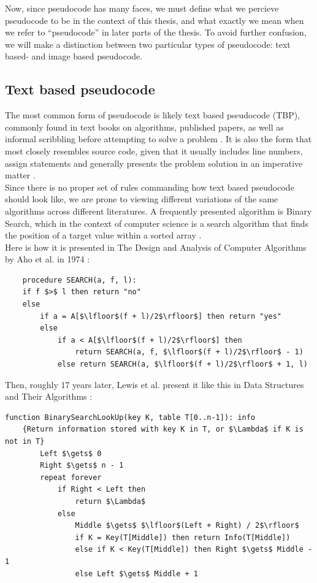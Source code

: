 Now, since pseudocode has many faces, we must define what we percieve pseudocode to be in the context of this thesis, and what exactly we mean when we refer to ``pseudocode'' in later parts of the thesis. To avoid further confusion, we will make a distinction between two particular types of pseudocode: text based- and image based pseudocode.

\subsection{Text based pseudocode}

The most common form of pseudocode is likely text based pseudocode (TBP), commonly found in text books on algorithms, published papers, as well as informal scribbling before attempting to solve a problem \cite{payAttentionToMLPs}\cite{BOOK:intro/Cormen/Leiserson}. It is also the form that most closely resembles source code, given that it usually includes line numbers, assign statements and generally presents the problem solution in an imperative matter \cite{proposalForParadigmGeneralPseudocode}. \hfill \\

Since there is no proper set of rules commanding how text based pseudocode should look like, we are prone to viewing different variations of the same algorithms across different literatures. A frequently presented algorithm is Binary Search, which in the context of computer science is a search algorithm that finds the position of a target value within a sorted array \cite{BOOK:intro/Cormen/Leiserson}. \hfill \\

Here is how it is presented in The Design and Analysis of Computer Algorithms by Aho et al. in 1974 \cite[139]{BOOK:DesignAnalysis/Aho}:

\begin{lstlisting}
    procedure SEARCH(a, f, l):
    if f $>$ l then return "no"
    else
        if a = A[$\lfloor$(f + l)/2$\rfloor$] then return "yes"
        else
            if a < A[$\lfloor$(f + l)/2$\rfloor$] then
                return SEARCH(a, f, $\lfloor$(f + l)/2$\rfloor$ - 1)
            else return SEARCH(a, $\lfloor$(f + l)/2$\rfloor$ + 1, l)
\end{lstlisting}

Then, roughly 17 years later, Lewis et al. present it like this in Data Structures and Their Algorithms \cite[182]{BOOK:DSA/Lewis}:

\begin{lstlisting}[basicstyle=\small\ttfamily]
    function BinarySearchLookUp(key K, table T[0..n-1]): info
    {Return information stored with key K in T, or $\Lambda$ if K is not in T}
        Left $\gets$ 0
        Right $\gets$ n - 1
        repeat forever
            if Right < Left then
                return $\Lambda$
            else
                Middle $\gets$ $\lfloor$(Left + Right) / 2$\rfloor$
                if K = Key(T[Middle]) then return Info(T[Middle])
                else if K < Key(T[Middle]) then Right $\gets$ Middle - 1
                else Left $\gets$ Middle + 1
\end{lstlisting}

